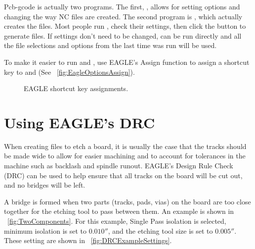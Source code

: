 \documentclass[11pt]{book}
\begin{document}
Pcb-gcode is actually two programs. The first, , allows for setting options and changing the way NC files are created. The second program is , which actually creates the files. Most people run , check their settings, then click the  button to generate files. If settings don't need to be changed,  can be run directly and all the file selections and options from the last time  was run will be used.

To make it easier to run  and , use EAGLE's Assign function to assign a shortcut key to  and  (See \figurename~\vref{fig:EagleOptionsAssign}).

\begin{figure}
	\caption{EAGLE shortcut key assignments.}
	\label{fig:EagleOptionsAssign}
\end{figure}

%
%
\section{Using EAGLE's DRC}\label{sec:EagleDRC}

When creating files to etch a board, it is usually the case that the tracks should be made wide to allow for easier machining and to account for tolerances in the machine such as backlash and spindle runout. EAGLE's Design Rule Check (DRC) can be used to help ensure that all tracks on the board will be cut out, and no bridges will be left. 

A bridge is formed when two parts (tracks, pads, vias) on the board are too close together for the etching tool to pass between them. An example is shown in \figurename~\vref{fig:TwoComponents}. For this example, Single Pass isolation is selected, minimum isolation is set to $0.010''$, and the etching tool size is set to $0.005''$. These setting are shown in \figurename~\vref{fig:DRCExampleSettings}.
\end{document}
